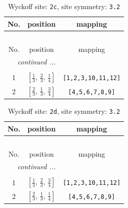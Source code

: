 \documentclass[fleqn,8pt]{jsarticle}
\begin{document}
\renewcommand{\arraystretch}{1.2}
\begin{longtable}{ccc}
\caption{Wyckoff site: {\tt 2c}, site symmetry: {\tt 3.2}}
 \\
 \hline \hline
No. & position & mapping \\ \hline \endfirsthead

\multicolumn{2}{l}{\tablename\ \thetable{}} \\
 \hline \hline
No. & position & mapping \\ \hline \endhead

 \hline \hline
\multicolumn{2}{r}{\footnotesize\it continued ...} \\ \endfoot

 \hline \hline
\multicolumn{2}{r}{} \\ \endlastfoot

1 & $\left[ \frac{1}{3},\, \frac{2}{3},\, \frac{1}{4} \right]$ & {\tt [1,2,3,10,11,12]} \\ \hline
2 & $\left[ \frac{2}{3},\, \frac{1}{3},\, \frac{3}{4} \right]$ & {\tt [4,5,6,7,8,9]} \\
\end{longtable}
\renewcommand{\arraystretch}{1.2}
\begin{longtable}{ccc}
\caption{Wyckoff site: {\tt 2d}, site symmetry: {\tt 3.2}}
 \\
 \hline \hline
No. & position & mapping \\ \hline \endfirsthead

\multicolumn{2}{l}{\tablename\ \thetable{}} \\
 \hline \hline
No. & position & mapping \\ \hline \endhead

 \hline \hline
\multicolumn{2}{r}{\footnotesize\it continued ...} \\ \endfoot

 \hline \hline
\multicolumn{2}{r}{} \\ \endlastfoot

1 & $\left[ \frac{1}{3},\, \frac{2}{3},\, \frac{3}{4} \right]$ & {\tt [1,2,3,10,11,12]} \\ \hline
2 & $\left[ \frac{2}{3},\, \frac{1}{3},\, \frac{1}{4} \right]$ & {\tt [4,5,6,7,8,9]} \\
\end{longtable}
\renewcommand{\arraystretch}{1.2}
\end{document}
